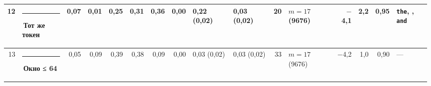 \documentclass[10pt]{article}
\begin{document}
\begin{minipage}{\linewidth}
\begin{center}
{\begin{tabular}{|r|l|r|r|r|r|r|r|l|l|r|l|r|r|r|l|}
12 & \textcolor[HTML]{E87BA4}{\rule{0.62em}{0.62em}}\,\textbf{Тот же токен} & 0,07 & 0,01 & 0,25 & 0,31 & 0,36 & 0,00 & 0,22 (0,02) & 0,03 (0,02) & 20 & $m{=}17$ (9676) & $-$4,1 & 2,2 & 0,95 & \texttt{\textvisiblespace{}the}, \texttt{\textvisiblespace{}}, \texttt{\textvisiblespace{}and} \\ \hline
13 & \textcolor[HTML]{EDA100}{\rule{0.62em}{0.62em}}\,\textbf{Окно ≤ 64} & 0,05 & 0,09 & 0,39 & 0,38 & 0,09 & 0,00 & 0,03 (0,02) & 0,03 (0,02) & 33 & $m{=}17$ (9676) & $-$4,2 & 1,0 & 0,90 & — \\ \hline
\hline\end{tabular}}\end{center}
\end{minipage}
\par\vspace{0.4em}
\noindent\begin{minipage}{\linewidth}

\end{minipage}
\end{document}
